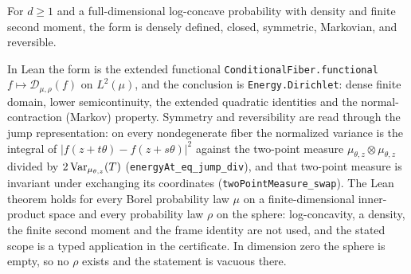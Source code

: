 \begin{lemma}
  \label{lem:conditional-fiber-form}
  \leanok
  For $d\ge1$ and a full-dimensional log-concave probability with density and finite
  second moment, the form
  is densely defined, closed, symmetric, Markovian, and reversible.

  In Lean the form is the extended functional \texttt{ConditionalFiber.functional}
  $f\mapsto\mathcal D_{\mu,\rho}(f)$ on $L^2(\mu)$, and the conclusion is
  \texttt{Energy.Dirichlet}: dense finite domain, lower semicontinuity, the extended quadratic
  identities and the normal-contraction (Markov) property.  Symmetry and reversibility are read
  through the jump representation: on every nondegenerate fiber the normalized variance is the
  integral of $|f(z+t\theta)-f(z+s\theta)|^2$ against the two-point measure
  $\mu_{\theta,z}\otimes\mu_{\theta,z}$ divided by $2\operatorname{Var}_{\mu_{\theta,z}}(T)$
  (\texttt{energyAt\_eq\_jump\_div}), and that two-point measure is invariant under exchanging
  its coordinates (\texttt{twoPointMeasure\_swap}).  The Lean theorem holds for every Borel
  probability law $\mu$ on a finite-dimensional inner-product space and every probability law
  $\rho$ on the sphere: log-concavity, a density, the finite second moment and the frame identity
  are not used, and the stated scope is a typed application in the certificate.  In dimension zero
  the sphere is empty, so no $\rho$ exists and the statement is vacuous there.
\end{lemma}
